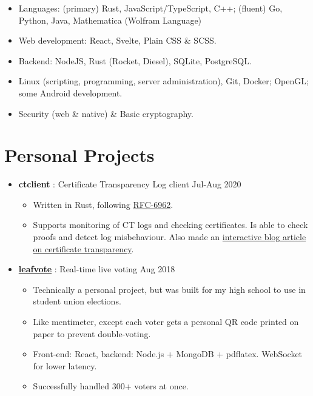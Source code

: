   \begin{itemize}[itemsep=0.1\parskip]
    \item Languages: (primary) Rust, JavaScript/TypeScript, C++; (fluent) Go, Python, Java, Mathematica (Wolfram Language)

    \item Web development: React, Svelte, Plain CSS \& SCSS.

    \item Backend: NodeJS, Rust (Rocket, Diesel), SQLite, PostgreSQL.

    \item Linux (scripting, programming, server administration), Git, Docker; OpenGL; some Android development.

    \item Security (web \& native) \& Basic cryptography.
  \end{itemize}

  \section{Personal Projects}

  \begin{itemize}

    \item \textbf{ctclient} : Certificate Transparency Log client \dashdiv{} Jul-Aug 2020

    \begin{itemize}
      \item Written in Rust, following \href{https://tools.ietf.org/html/rfc6962}{\color{link}RFC-6962}.
      \item Supports monitoring of CT logs and checking certificates. Is able to check proofs and detect log misbehaviour. Also made an \href{https://blog.maowtm.org/ct/en.html}{\color{link}interactive blog article on certificate transparency}.
    \end{itemize}

    \item \href{https://leafvote.mww.moe}{\color{link}\textbf{leafvote}} : Real-time live voting \dashdiv{} Aug 2018

    \begin{itemize}
      \item Technically a personal project, but was built for my high school to use in student union elections.
      \item Like mentimeter, except each voter gets a personal QR code printed on paper to prevent double-voting.
      \item Front-end: React, backend: Node.js + MongoDB + pdflatex. WebSocket for lower latency.
      \item Successfully handled 300+ voters at once.
    \end{itemize}

  \end{itemize}


